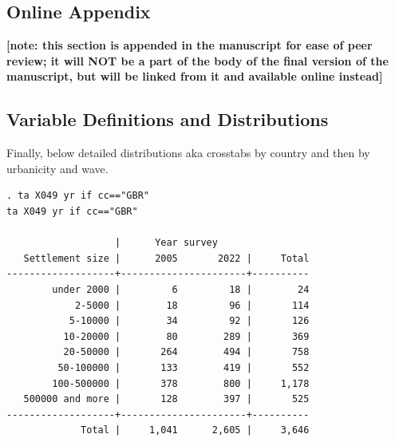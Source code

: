 \documentclass[10pt, letterpaper]{article}
\begin{document}
\begin{spacing}{1.4}




\section{Online Appendix}

\textbf{[note: this section is appended in the manuscript for ease of peer
  review; it will NOT be a part of the body of the final version of  the
  manuscript, but will be linked from it and  available online instead]} %


\subsection{Variable Definitions and Distributions}





Finally, below detailed distributions aka crosstabs by country and then by
urbanicity and wave. 

\begin{scriptsize}
\begin{spacing}{.85}
\begin{verbatim}
. ta X049 yr if cc=="GBR"
ta X049 yr if cc=="GBR"

                   |      Year survey
   Settlement size |      2005       2022 |     Total
-------------------+----------------------+----------
        under 2000 |         6         18 |        24 
            2-5000 |        18         96 |       114 
           5-10000 |        34         92 |       126 
          10-20000 |        80        289 |       369 
          20-50000 |       264        494 |       758 
         50-100000 |       133        419 |       552 
        100-500000 |       378        800 |     1,178 
   500000 and more |       128        397 |       525 
-------------------+----------------------+----------
             Total |     1,041      2,605 |     3,646 


\end{verbatim}
\end{spacing}
\end{scriptsize}
\end{spacing}
\end{document}

